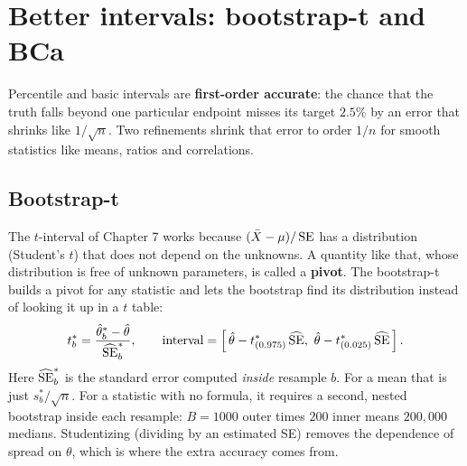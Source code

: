 \section{Better intervals: bootstrap-t and BCa}
\label{sec:boot-t-bca}

Percentile and basic intervals are \textbf{first-order accurate}: the chance
that the truth falls beyond one particular endpoint misses its target $2.5\%$
by an error that shrinks like $1/\sqrt{n}$. Two refinements shrink that error
to order $1/n$ for smooth statistics like means, ratios and correlations.

\subsection{Bootstrap-t}

The $t$-interval of Chapter 7 works because $(\bar X - \mu)/\operatorname{SE}$ has a
distribution (Student's $t$) that does not depend on the unknowns. A quantity
like that, whose distribution is free of unknown parameters, is called a
\textbf{pivot}. The bootstrap-t builds a pivot for any statistic and lets the
bootstrap find its distribution instead of looking it up in a $t$ table:
\[
  t^*_b = \frac{\hat\theta^*_b - \hat\theta}{\widehat{\operatorname{SE}}^*_b}, \qquad
  \text{interval} = \left[\, \hat\theta - t^*_{(0.975)}\,\widehat{\operatorname{SE}},\
  \hat\theta - t^*_{(0.025)}\,\widehat{\operatorname{SE}} \,\right].
\]
Here $\widehat{\operatorname{SE}}^*_b$ is the standard error computed \emph{inside}
resample $b$. For a mean that is just $s^*_b/\sqrt n$. For a statistic with no
formula, it requires a second, nested bootstrap inside each resample: $B=1000$
outer times $200$ inner means $200{,}000$ medians. Studentizing (dividing by an
estimated SE) removes the dependence of spread on $\theta$, which is where the
extra accuracy comes from.

